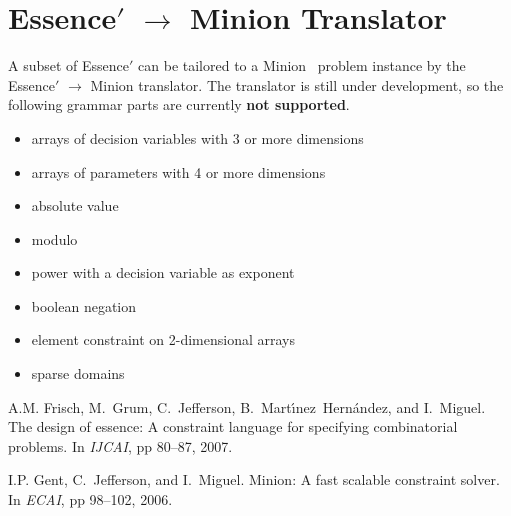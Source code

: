 \documentclass{article}
\begin{document}
\section{{\sc Essence}$'$ $\rightarrow$ {\sc Minion} Translator}

A subset of {\sc Essence}$'$ can be tailored to a {\sc Minion}~\cite{minion} 
problem instance by the {\sc Essence}$'$ $\rightarrow$ {\sc Minion} translator.
The translator is still under development, so the
following grammar parts are currently {\bf not supported}.

\begin{itemize}
  \item arrays of decision variables with 3 or more dimensions 
  \item arrays of parameters with 4 or more dimensions 
  \item absolute value
  \item modulo
  \item power with a decision variable as exponent
  \item boolean negation
  \item element constraint on 2-dimensional arrays 
  \item sparse domains
\end{itemize} 

\begin{thebibliography}{10}
\scriptsize
{}
A.M. Frisch, M.~Grum, C.~Jefferson, B.~Mart\'{\i}nez~Hern{\'a}ndez, and
  I.~Miguel.
\newblock The design of essence: A constraint language for specifying
  combinatorial problems.
\newblock In {\em IJCAI}, pp 80--87, 2007.

I.P. Gent, C.~Jefferson, and I.~Miguel.
\newblock Minion: A fast scalable constraint solver.
\newblock In {\em ECAI}, pp 98--102, 2006.
\end{thebibliography}
\end{document}

